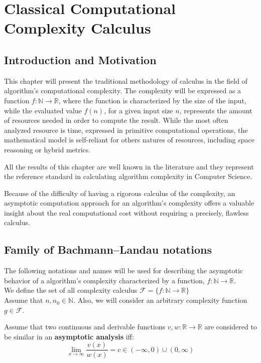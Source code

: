\chapter{Classical Computational Complexity Calculus }


\section{Introduction and Motivation}
This chapter will present the traditional methodology of calculus in the field of algorithm's computational complexity. The complexity will be expressed as a function $f:\mathbb{N}\longrightarrow\mathbb{R}$, where the function is characterized by the size of the input, while the evaluated value $f(n)$, for a given input size $n$, represents the amount of resources needed in order to compute the result. While the most often analyzed resource is time, expressed in primitive computational operations, the mathematical model is self-reliant for others natures of resources, including space reasoning or hybrid metrics.

All the results of this chapter are well known in the literature and they represent the reference standard in calculating algorithm complexity in Computer Science. 

Because of the difficulty of having a rigorous calculus of the complexity, an asymptotic computation approach for an algorithm's complexity offers a valuable insight about the real computational cost without requiring a precisely, flawless calculus.



\section{Family of Bachmann–Landau notations}
The following notations and names will be used for describing the asymptotic behavior of a algorithm's complexity characterized by a function, $f:\mathbb{N}\longrightarrow\mathbb{R}$. \\
We define the set of all complexity calculus $\mathcal{F}= \lbrace f:\mathbb{N}\longrightarrow\mathbb{R} \rbrace$
\\Assume that $n, n_{0}\in\mathbb{N}$. Also, we will consider an arbitrary complexity function $g \in \mathcal{F}$. \\

\begin{definition}
Assume that two continuous and derivable functions $v,w:\mathbb{R}\longrightarrow\mathbb{R}$ are considered to be similar in an \textbf{asymptotic analysis} iff: 
  \[\lim_{x\to\infty} \frac{v(x)}{w(x)} = c \in (-\infty, 0) \cup (0,\infty) \]
\end{definition}

